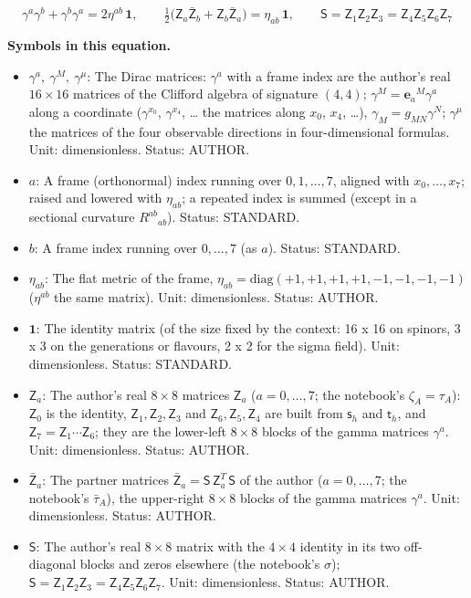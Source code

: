 \documentclass[
  10pt,
]{article}
\providecommand{\tightlist}{%
  \setlength{\itemsep}{0pt}\setlength{\parskip}{0pt}}
\begin{document}
\[
\gamma^a\gamma^b + \gamma^b\gamma^a = 2\eta^{ab}\,\mathbf{1},\qquad
\tfrac12\big(\mathsf{Z}_a\bar{\mathsf{Z}}_b + \mathsf{Z}_b\bar{\mathsf{Z}}_a\big) = \eta_{ab}\,\mathbf{1},\qquad
\mathsf{S} = \mathsf{Z}_1\mathsf{Z}_2\mathsf{Z}_3 = \mathsf{Z}_4\mathsf{Z}_5\mathsf{Z}_6\mathsf{Z}_7
\]

\textbf{Symbols in this equation.}

\begin{itemize}
\tightlist
\item
  \(\gamma^a,\ \gamma^M,\ \gamma^\mu\): The Dirac matrices: \(\gamma^a\)
  with a frame index are the author's real \(16 \times 16\) matrices of
  the Clifford algebra of signature \((4, 4)\);
  \(\gamma^M = \mathbf{e}_a{}^M\gamma^a\) along a coordinate
  (\(\gamma^{x_0}\), \(\gamma^{x_4}\), \ldots{} the matrices along
  \(x_0\), \(x_4\), \ldots), \(\gamma_M = g_{MN}\gamma^N\);
  \(\gamma^\mu\) the matrices of the four observable directions in
  four-dimensional formulas. Unit: dimensionless. Status: AUTHOR.
\item
  \(a\): A frame (orthonormal) index running over \(0, 1, \dots, 7\),
  aligned with \(x_0, \dots, x_7\); raised and lowered with
  \(\eta_{ab}\); a repeated index is summed (except in a sectional
  curvature \(R^{ab}{}_{ab}\)). Status: STANDARD.
\item
  \(b\): A frame index running over \(0, \dots, 7\) (as \(a\)). Status:
  STANDARD.
\item
  \(\eta_{ab}\): The flat metric of the frame,
  \(\eta_{ab} = \mathrm{diag}(+1, +1, +1, +1, -1, -1, -1, -1)\)
  (\(\eta^{ab}\) the same matrix). Unit: dimensionless. Status: AUTHOR.
\item
  \(\mathbf{1}\): The identity matrix (of the size fixed by the context:
  16 x 16 on spinors, 3 x 3 on the generations or flavours, 2 x 2 for
  the sigma field). Unit: dimensionless. Status: STANDARD.
\item
  \(\mathsf{Z}_a\): The author's real \(8\times8\) matrices
  \(\mathsf{Z}_a\) (\(a = 0, \dots, 7\); the notebook's
  \(\zeta_A = \tau_A\)): \(\mathsf{Z}_0\) is the identity,
  \(\mathsf{Z}_1, \mathsf{Z}_2, \mathsf{Z}_3\) and
  \(\mathsf{Z}_6, \mathsf{Z}_5, \mathsf{Z}_4\) are built from
  \(\mathsf{s}_h\) and \(\mathsf{t}_h\), and
  \(\mathsf{Z}_7 = \mathsf{Z}_1\cdots\mathsf{Z}_6\); they are the
  lower-left \(8\times8\) blocks of the gamma matrices \(\gamma^a\).
  Unit: dimensionless. Status: AUTHOR.
\item
  \(\bar{\mathsf{Z}}_a\): The partner matrices
  \(\bar{\mathsf{Z}}_a = \mathsf{S}\,\mathsf{Z}_a^T\,\mathsf{S}\) of the
  author (\(a = 0, \dots, 7\); the notebook's \(\bar\tau_A\)), the
  upper-right \(8\times8\) blocks of the gamma matrices \(\gamma^a\).
  Unit: dimensionless. Status: AUTHOR.
\item
  \(\mathsf{S}\): The author's real \(8\times8\) matrix with the
  \(4\times4\) identity in its two off-diagonal blocks and zeros
  elsewhere (the notebook's \(\sigma\));
  \(\mathsf{S} = \mathsf{Z}_1\mathsf{Z}_2\mathsf{Z}_3 = \mathsf{Z}_4\mathsf{Z}_5\mathsf{Z}_6\mathsf{Z}_7\).
  Unit: dimensionless. Status: AUTHOR.
\end{itemize}
\end{document}
